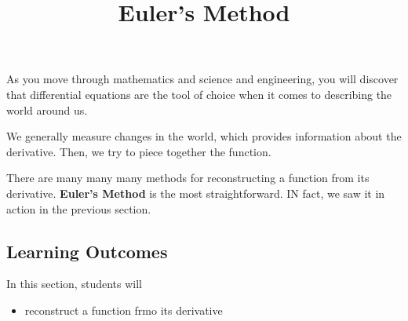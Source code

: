 \documentclass{ximera}
\title{Euler's Method}
\begin{document}
\begin{abstract}
\end{abstract}
\maketitle








As you move through mathematics and science and engineering, you will discover that differential equations are the tool of choice when it comes to describing the world around us.


We generally measure changes in the world, which provides information about the derivative.  Then, we try to piece together the function.

There are many many many methods for reconstructing a function from its derivative.  \textbf{Euler's Method} is the most straightforward.  IN fact, we saw it in action in the previous section.








\subsection{Learning Outcomes}


\begin{sectionOutcomes}
In this section, students will 

\begin{itemize}
\item reconstruct a function frmo its derivative
\end{itemize}
\end{sectionOutcomes}
\end{document}
